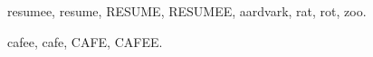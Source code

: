 \documentclass{article}
\begin{document}
\gls{resumee}, \gls{resume}, \gls{RESUME}, \gls{RESUMEE},
\gls{aardvark}, \gls{rat}, \gls{rot}, \gls{zoo}.

\gls{cafee}, \gls{cafe}, \gls{CAFE}, \gls{CAFEE}.

\printunsrtglossaries
\end{document}
